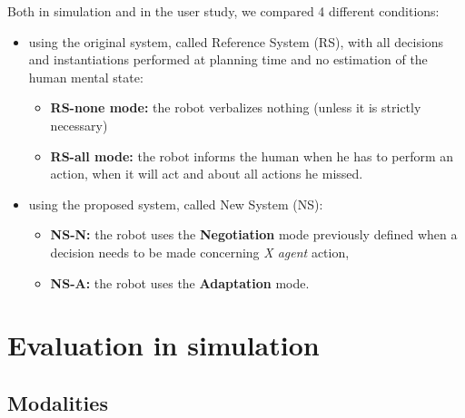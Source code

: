 \documentclass[english,a4paper,11pt,twoside]{StyleThese}
\begin{document}
Both in simulation and in the user study, we compared 4 different conditions:
\begin{itemize}
\item using the original system, called Reference System (RS), with all decisions and instantiations performed at planning time and no estimation of the human mental state:
\begin{itemize}
\item \textbf{RS-none mode:} the robot verbalizes nothing (unless it is strictly necessary)
\item \textbf{RS-all mode:} the robot informs the human when he has to perform an action, when it will act and about all actions he missed.
\end{itemize}
\item using the proposed system, called New System (NS): 
\begin{itemize}
\item \textbf{NS-N:} the robot uses the \textbf{Negotiation} mode previously defined when a decision needs to be made concerning \textit{X agent} action,
\item \textbf{NS-A:} the robot uses the \textbf{Adaptation} mode.
\end{itemize}
\end{itemize}

\section{Evaluation in simulation}

\subsection{Modalities}
\end{document}
